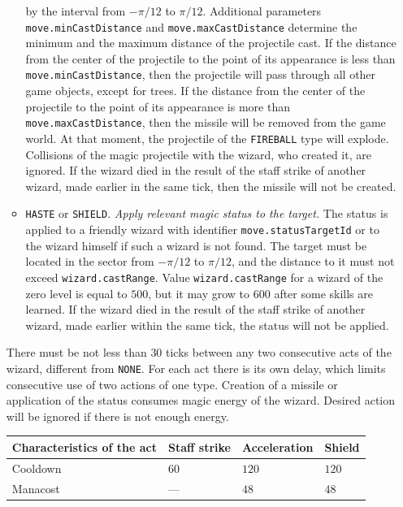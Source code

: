 \begin{itemize}
\begin{itemize}
                    by the interval from $-\pi / 12$ to $\pi / 12$. Additional parameters \texttt{move.minCastDistance} and
                    \texttt{move.maxCastDistance} determine the minimum and the maximum distance of the projectile cast. If the distance from the center
                    of the projectile to the point of its appearance is less than \texttt{move.minCastDistance}, then the projectile will pass through all
                    other game objects, except for trees. If the distance from the center of the projectile to the point of its appearance is more than
                    \texttt{move.maxCastDistance}, then the missile will be removed from the game world. At that moment, the projectile of the \texttt{FIREBALL} type will explode.
                    Collisions of the magic projectile with the wizard, who created it, are ignored. If the wizard died in the result of the staff strike
                    of another wizard, made earlier in the same tick, then the missile will not be created.
            \item \texttt{HASTE} or \texttt{SHIELD}. \textit{Apply relevant magic status to the target.} The status is applied to
                    a friendly wizard with identifier \texttt{move.statusTargetId} or to the wizard himself if such a wizard is not
                    found. The target must be located in the sector from $-\pi / 12$ to $\pi / 12$, and the distance to it must not exceed
                    \texttt{wizard.castRange}. Value \texttt{wizard.castRange} for a wizard of the zero level is equal to $500$, but it may
                    grow to $600$ after some skills are learned. If the wizard died in the result of the staff strike of another wizard,
                    made earlier within the same tick, the status will not be applied.
            \end{itemize}
 
            There must be not less than $30$ ticks between any two consecutive acts of the wizard, different from \texttt{NONE}. For each
            act there is its own delay, which limits consecutive use of two actions of one
            type. Creation of a missile or application of the status consumes magic energy of the wizard. Desired action will be ignored
            if there is not enough energy.
 
            \begin{tabular}{| l | l | l | l |}
            \hline
            Characteristics of the act & Staff strike & Acceleration & Shield   \\
            \hline
            Cooldown           & $60$          & $120$         & $120$ \\
            Manacost               & ---               & $48$          & $48$  \\
            \hline
            \end{tabular}
 

\end{itemize}
